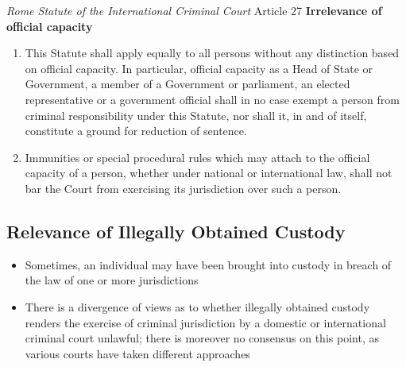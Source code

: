 \begin{statutedetails}{\textit{Rome Statute of the International Criminal Court} Article 27}
    \flushleft
    \textbf{Irrelevance of official capacity}
    \begin{enumerate}
        \item This Statute shall apply equally to all persons without any distinction based on official capacity. In particular, official capacity as a Head of State or Government, a member of a Government or parliament, an elected representative or a government official shall in no case exempt a person from criminal responsibility under this Statute, nor shall it, in and of itself, constitute a ground for reduction of sentence. 
        \item Immunities or special procedural rules which may attach to the official capacity of a person, whether under national or international law, shall not bar the Court from exercising its jurisdiction over such a person.
    \end{enumerate}
\end{statutedetails}

\subsection{Relevance of Illegally Obtained Custody}
\begin{itemize}
    \item Sometimes, an individual may have been brought into custody in breach of the law of one or more jurisdictions
    \item There is a divergence of views as to whether illegally obtained custody renders the exercise of criminal jurisdiction by a domestic or international criminal court unlawful; there is moreover no consensus on this point, as various courts have taken different approaches
\end{itemize}


